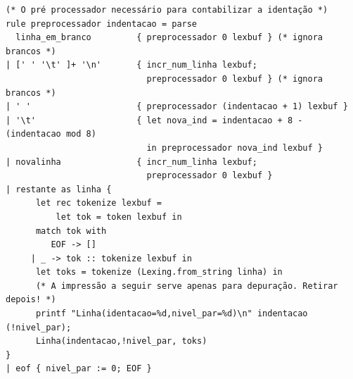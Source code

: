 \documentclass{article}
\begin{document}
\begin{lstlisting}
(* O pré processador necessário para contabilizar a identação *)
rule preprocessador indentacao = parse
  linha_em_branco         { preprocessador 0 lexbuf } (* ignora brancos *)
| [' ' '\t' ]+ '\n'       { incr_num_linha lexbuf;
                            preprocessador 0 lexbuf } (* ignora brancos *)
| ' '                     { preprocessador (indentacao + 1) lexbuf }
| '\t'                    { let nova_ind = indentacao + 8 - (indentacao mod 8) 
                            in preprocessador nova_ind lexbuf }
| novalinha               { incr_num_linha lexbuf;
                            preprocessador 0 lexbuf }
| restante as linha {
      let rec tokenize lexbuf =
          let tok = token lexbuf in
	  match tok with
	     EOF -> []
	 | _ -> tok :: tokenize lexbuf in
      let toks = tokenize (Lexing.from_string linha) in
      (* A impressão a seguir serve apenas para depuração. Retirar depois! *)
      printf "Linha(identacao=%d,nivel_par=%d)\n" indentacao (!nivel_par);
      Linha(indentacao,!nivel_par, toks)
}
| eof { nivel_par := 0; EOF }





\end{lstlisting}
\end{document}

